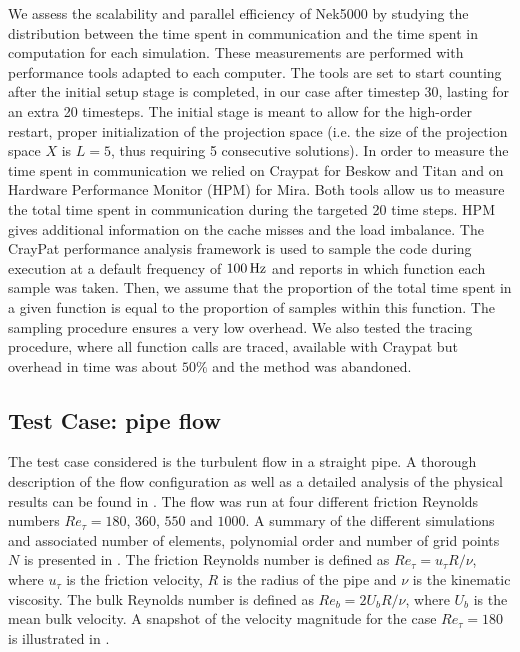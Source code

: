 \documentclass{sig-alternate}
\begin{document}

We assess the scalability and parallel efficiency of Nek5000 by studying the distribution
between the time spent in communication and the time spent in computation for each 
simulation. These measurements are performed with performance tools adapted to each 
computer. The tools are set to start counting after the initial setup stage is 
completed, in our case after timestep 30, lasting for an extra 20 timesteps.  
The initial stage is meant to allow for the high-order restart, proper initialization 
of the projection space (i.e.  the size of the projection space $X$ is $L= 5$, thus
requiring 5 consecutive solutions). In order to measure the time spent in communication 
we relied on Craypat for
Beskow and Titan and on Hardware Performance Monitor (HPM) for Mira. Both tools
allow us to measure the total time spent in communication during the targeted 20 time
steps. HPM gives additional information on the cache misses and the load
imbalance. The CrayPat performance analysis framework is used to sample the code 
during execution at a default frequency of $\unit[100]{Hz}$ and reports in which 
function each sample was taken. Then, we assume that the proportion of the total 
time spent in a given function is equal to the proportion of samples within this 
function. The sampling procedure ensures a very low overhead. We also tested the 
tracing procedure, where all function calls are traced, available with Craypat 
but overhead in time was about $50\%$ and the method was abandoned.

\subsection{Test Case: pipe flow}
\label{sec:pipe}

The test case considered is the turbulent flow in a straight pipe. A thorough description of the flow configuration as well as a detailed analysis of the physical results can be found in \cite{Khoury2013}. The flow was run at four different friction Reynolds numbers $Re_{\tau} = 180$, $360$, $550$ and $1000$. A summary of the different simulations and associated number of elements, polynomial order and number of grid points $N$ is presented in . The friction Reynolds number is defined as $Re_{\tau} = u_{\tau} R / \nu$, where $u_{\tau}$ is the friction velocity, $R$ is the radius of the pipe and $\nu$ is the kinematic viscosity. The bulk Reynolds number is defined as $Re_{b} = 2 U_b R / \nu$, where $U_b$ is the mean bulk velocity. A snapshot of the velocity magnitude for the case $Re_{\tau} = 180$ is illustrated in .
\end{document}
